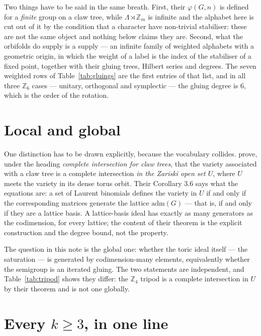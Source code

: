 \documentclass[11pt,a4paper]{article}
\theoremstyle{definition}
\newcommand{\ZZ}{\mathbb{Z}}
\begin{document}
Two things have to be said in the same breath. First, their $\varphi(G,n)$ is defined for a
\emph{finite} group on a claw tree, while $\Lambda\rtimes\ZZ_m$ is infinite and the alphabet here is
cut out of it by the condition that a character have non-trivial stabiliser: these are not the same
object and nothing below claims they are. Second, what the orbifolds do supply is a supply --- an
infinite family of weighted alphabets with a geometric origin, in which the weight of a label is the
index of the stabiliser of a fixed point, together with their gluing trees, Hilbert series and
degrees. The seven weighted rows of Table~\ref{tab:gluings} are the first entries of that list, and
in all three $\ZZ_6$ cases --- unitary, orthogonal and symplectic --- the gluing degree is $6$,
which is the order of the rotation.

\section{Local and global}\label{sec:localglobal}

One distinction has to be drawn explicitly, because the vocabulary collides. \cite{CFM} prove, under
the heading \emph{complete intersection for claw trees}, that the variety associated with a claw tree
is a complete intersection \emph{in the Zariski open set $U$}, where $U$ meets the variety in its
dense torus orbit. Their Corollary 3.6 says what the equations are: a set of Laurent binomials
defines the variety in $U$ if and only if the corresponding matrices generate the lattice
$\mathrm{adm}(G)$ --- that is, if and only if they are a lattice basis. A lattice-basis ideal has
exactly as many generators as the codimension, for every lattice; the content of their theorem is
the explicit construction and the degree bound, not the property.

The question in this note is the global one: whether the toric ideal itself --- the saturation ---
is generated by codimension-many elements, equivalently whether the semigroup is an iterated gluing.
The two statements are independent, and Table~\ref{tab:tripod} shows they differ: the $\ZZ_4$
tripod is a complete intersection in $U$ by their theorem and is not one globally.

\section{Every $k\ge3$, in one line}\label{sec:allk}
\end{document}
